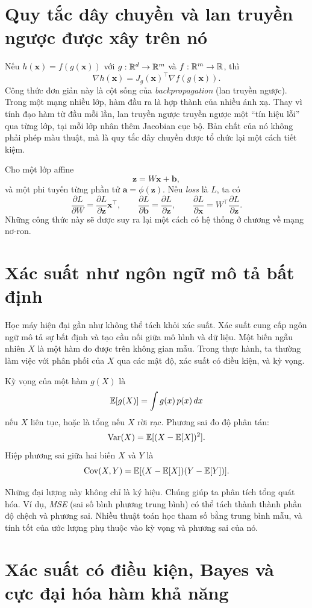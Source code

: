 \section{Quy tắc dây chuyền và lan truyền ngược được xây trên nó}

Nếu $h(\bm{x}) = f(g(\bm{x}))$ với $g:\mathbb{R}^d\to\mathbb{R}^m$ và $f:\mathbb{R}^m\to\mathbb{R}$, thì
\[
\nabla h(\bm{x}) = J_g(\bm{x})^\top \nabla f(g(\bm{x})).
\]
Công thức đơn giản này là cột sống của \emph{backpropagation} (lan truyền ngược). Trong một mạng nhiều lớp, hàm đầu ra là hợp thành của nhiều ánh xạ. Thay vì tính đạo hàm từ đầu mỗi lần, lan truyền ngược truyền ngược một ``tín hiệu lỗi'' qua từng lớp, tại mỗi lớp nhân thêm Jacobian cục bộ. Bản chất của nó không phải phép màu thuật, mà là quy tắc dây chuyền được tổ chức lại một cách tiết kiệm.

Cho một lớp affine
\[
\bm{z} = W\bm{x} + \bm{b},
\]
và một phi tuyến từng phần tử $\bm{a}=\phi(\bm{z})$. Nếu \emph{loss} là $L$, ta có
\[
\frac{\partial L}{\partial W}
=
\frac{\partial L}{\partial \bm{z}}
\bm{x}^\top,
\qquad
\frac{\partial L}{\partial \bm{b}}
=
\frac{\partial L}{\partial \bm{z}},
\qquad
\frac{\partial L}{\partial \bm{x}}
=
W^\top \frac{\partial L}{\partial \bm{z}}.
\]
Những công thức này sẽ được suy ra lại một cách có hệ thống ở chương về mạng nơ-ron.

\section{Xác suất như ngôn ngữ mô tả bất định}

Học máy hiện đại gần như không thể tách khỏi xác suất. Xác suất cung cấp ngôn ngữ mô tả sự bất định và tạo cầu nối giữa mô hình và dữ liệu. Một biến ngẫu nhiên $X$ là một hàm đo được trên không gian mẫu. Trong thực hành, ta thường làm việc với phân phối của $X$ qua các mật độ, xác suất có điều kiện, và kỳ vọng.

Kỳ vọng của một hàm $g(X)$ là
\[
\mathbb{E}[g(X)] = \int g(x)\,p(x)\,dx
\]
nếu $X$ liên tục, hoặc là tổng nếu $X$ rời rạc. Phương sai đo độ phân tán:
\[
\mathrm{Var}(X)=\mathbb{E}[(X-\mathbb{E}[X])^2].
\]
Hiệp phương sai giữa hai biến $X$ và $Y$ là
\[
\mathrm{Cov}(X,Y)=\mathbb{E}[(X-\mathbb{E}[X])(Y-\mathbb{E}[Y])].
\]

Những đại lượng này không chỉ là ký hiệu. Chúng giúp ta phân tích tổng quát hóa. Ví dụ, \emph{MSE} (sai số bình phương trung bình) có thể tách thành thành phần độ chệch và phương sai. Nhiều thuật toán học tham số bằng trung bình mẫu, và tính tốt của ước lượng phụ thuộc vào kỳ vọng và phương sai của nó.

\section{Xác suất có điều kiện, Bayes và cực đại hóa hàm khả năng}

